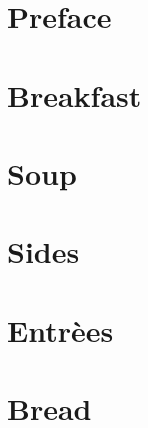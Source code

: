 \dominitoc  %
\nomtcrule  %

\tableofcontents


\chapter*{Preface}
\enlargethispage{5\baselineskip}  %


\clearpage

\mainmatter

\setcounter{mtc}{0}  %
\mtcaddchapter       %
\chapter{Breakfast}
\minitoc
\clearpage



\chapter{Soup}
\minitoc
\clearpage



\chapter{Sides}
\minitoc
\clearpage



\chapter{Entr\`{e}es}
\minitoc
\clearpage








\chapter{Bread}
\minitoc
\clearpage



